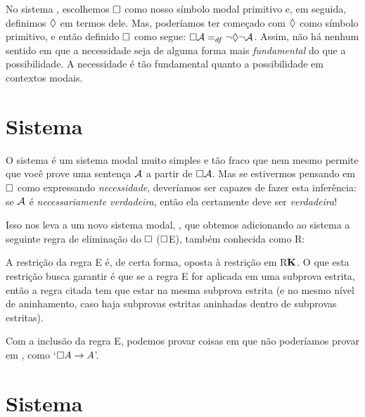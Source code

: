No sistema   \mlK, escolhemos $\Box$ como nosso símbolo modal primitivo e, em seguida, definimos $\Diamond$ em termos dele. Mas, poderíamos ter começado com $\Diamond$ como símbolo  primitivo, e então definido $\Box$ como segue: $\Box\mathcal{A} =_{df} \neg \Diamond \neg \mathcal{A}$. 
Assim,  não há nenhum sentido em que a necessidade seja de alguma forma mais \emph{fundamental} do que a possibilidade. A necessidade é tão fundamental quanto a possibilidade em contextos modais.


\section{Sistema \mlT}
\label{T}

O sistema  \mlK{}   é um sistema modal muito simples e  tão fraco que nem mesmo permite que você prove uma sentença $\mathcal{A}$  a partir de $\Box\mathcal{A}$.  Mas se estivermos pensando em $\Box$ como expressando \emph{necessidade}, deveríamos ser capazes de fazer esta inferência: se $\mathcal{A}$ é \emph{necessariamente verdadeira}, então ela certamente deve ser \emph{verdadeira}!

Isso nos leva a um novo sistema modal, \mlT, que obtemos adicionando  ao sistema \mlK{}  a seguinte regra de eliminação do $\Box$ ($\Box$E), também conhecida como  R\mlT{}:

A restrição da regra \ebox E é, de certa forma, oposta à restrição em R$\mathbf{K}$. 
O que esta restrição busca garantir é que se a regra \ebox E for aplicada em uma subprova estrita, então a regra citada tem que estar na mesma subprova estrita (e no mesmo nível de aninhamento, caso haja subprovas estritas aninhadas dentro de subprovas estritas).

Com a inclusão da regra \ebox E, podemos provar coisas em \mlT{} que não poderíamos provar em \mlK, como `$\Box A \rightarrow A$'.

\section{Sistema \mlSfour}
\label{S4}

